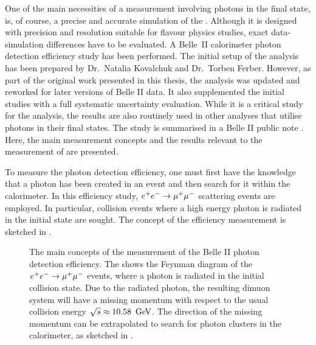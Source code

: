 One of the main necessities of a measurement involving photons in the final state, is, of course, a precise and accurate simulation of the \ECL.
Although it is designed with precision and resolution suitable for flavour physics studies, 
exact data-simulation differences have to be evaluated.
A Belle~II calorimeter photon detection efficiency study has been performed.
The initial setup of the analysis has been prepared by Dr.~Natalia Kovalchuk and Dr.~Torben Ferber. 
However, as part of the original work presented in this thesis, the analysis was updated and reworked for later versions of Belle II data. 
It also supplemented the initial studies with a full systematic uncertainty evaluation.
While it is a critical study for the \BtoXsgamma analysis, the results are also routinely used in other analyses that utilise photons in their final states.
The study is summarised in a Belle II public note \cite{Henrikas:2604}.
Here, the main measurement concepts and the results relevant to the measurement of \BtoXsgamma are presented.

To measure the photon detection efficiency, one must first have the knowledge that a photon has been created in an event and then search for it within the calorimeter.
In this efficiency study, $e^+e^-\rightarrow\mu^+\mu^-$ scattering events are employed.
In particular, collision events where a high energy photon is radiated in the initial state are sought.
The concept of the efficiency measurement is sketched in .
\begin{figure}[htbp!]
    \centering
    \caption{\label{fig:photon_efficiency_measurement} The main concepts of the measurement of the Belle II photon detection efficiency.
    The  shows the Feynman diagram of the $e^+e^-\rightarrow\mu^+\mu^-$ events, where a photon is radiated in the initial collision state.
    Due to the radiated photon, the resulting dimuon system will have a missing momentum with respect to the usual collision energy $\sqrt{s}\approx10.58~\mathrm{\,Ge\kern -0.1em V}$.
    The direction of the missing momentum can be extrapolated to search for photon clusters in the calorimeter, as sketched in .
    }
\end{figure}

